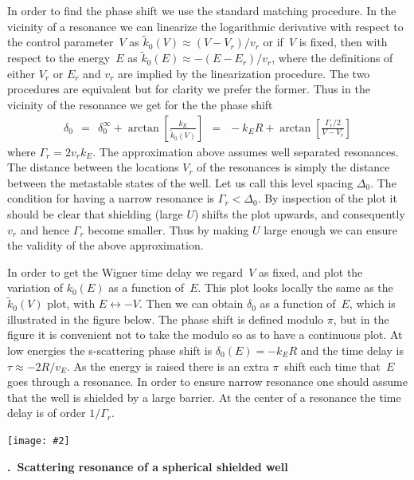 \documentclass[onecolumn,fleqn, 11pt]{revtex4}
\newcommand{\putgraph}[2][0.30\hsize]{\texttt{[image: \#2]}}
\newcommand{\beq}{\begin{eqnarray}}
\newcommand{\eeq}{\end{eqnarray}}
\renewcommand{\thesubsection}{\arabic{subsection}}
\renewcommand{\thesubsubsection}{\arabic{subsubsection}}
\newcommand{\sheadC}[1]
{
\addtocounter{subsubsection}{1}
\vspace{5mm}
{\bf \thesubsection.\thesubsubsection \ #1}  
\nopagebreak
\phantomsection
}
\begin{document}
In order to find the phase shift we use the standard 
matching procedure. In the vicinity of a resonance 
we can linearize the logarithmic derivative 
with respect to the control parameter~$V$ 
as ${\tilde{k}_0(V) \approx (V-V_r)/v_r}$
or if~$V$ is fixed, then with respect to the energy~$E$ 
as ${\tilde{k}_0(E) \approx -(E-E_r)/v_r}$, 
where the definitions of either $V_r$ or $E_r$ and $v_r$ are implied 
by the linearization procedure.
The two procedures are equivalent 
but for clarity we prefer the former.      
Thus in the vicinity of the resonance 
we get for the the phase shift
\beq
\delta_{0} \ \ = \ \ 
\delta_{0}^{\infty} + \arctan\left[ \frac{k_E}{\tilde{k}_0(V)}  \right]
\ \ = \ \ 
-k_E R + \arctan\left[\frac{\Gamma_r/2}{V-V_r}\right]
\eeq
where $\Gamma_r = 2 v_r k_E$.
The approximation above assumes 
well separated resonances.   
The distance between 
the locations $V_r$ of the resonances   
is simply the distance between the 
metastable states of the well. 
Let us call this level spacing $\Delta_0$. 
The condition for having a narrow resonance 
is $\Gamma_r < \Delta_0$. 
By inspection of the plot it should be clear 
that shielding (large $U$) shifts 
the plot upwards, and consequently $v_r$ 
and hence $\Gamma_r$ become smaller. 
Thus by making $U$ large enough we can 
ensure the validity of the above approximation.


In order to get the Wigner time delay we  
regard~$V$ as fixed, and plot the variation 
of $k_0(E)$ as a function of~$E$. 
This plot looks locally the same 
as the~$\tilde{k}_0(V)$ plot, with ${E \leftrightarrow -V}$. 
Then we can obtain $\delta_{0}$ as a function of~$E$, 
which is illustrated in the figure below. 
The phase shift is defined modulo $\pi$, 
but in the figure it is convenient 
not to take the modulo so as to have a continuous plot. 
At low energies the s-scattering   
phase shift is ${\delta_0(E)=-k_ER}$ 
and the time delay is $\tau \approx -2R/v_E$.
As the energy is raised there is an extra $\pi$~shift 
each time that~$E$ goes through a resonance. 
In order to ensure narrow resonance one should  
assume that the well is shielded by a large barrier. 
At the center of a resonance the time delay 
is of order $1/\Gamma_r$.  

    
\begin{center}
\putgraph[0.36\hsize]{PhaseShift}
\end{center}







\sheadC{Scattering resonance of a spherical shielded well}
\end{document}
